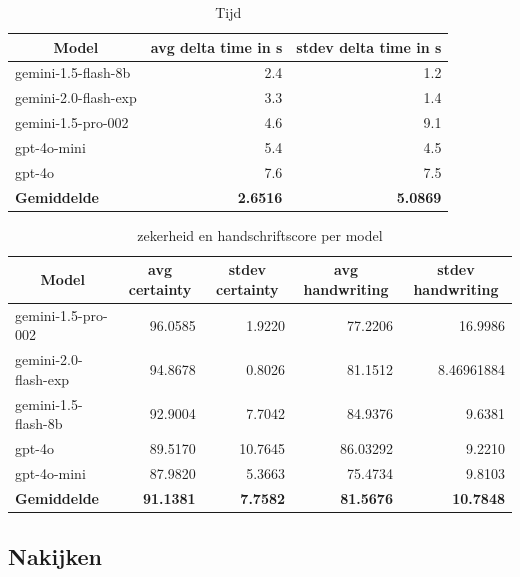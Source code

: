 \documentclass[12pt]{article}
\begin{document}
\noindent\begin{table}[H]
\caption{Tijd} 
\label{fig:time-model} 
\begin{tabularx}{\textwidth}{X *2{r}}
    \toprule
    \multicolumn{1}{c}{\textbf{Model}} & \multicolumn{1}{c}{\textbf{avg delta time in s}} & \multicolumn{1}{c}{\textbf{stdev delta time in s}} \\
    \midrule
    gemini-1.5-flash-8b & 2.4 & 1.2 \\
    gemini-2.0-flash-exp & 3.3 & 1.4 \\
    gemini-1.5-pro-002 & 4.6 & 9.1 \\
    gpt-4o-mini & 5.4 & 4.5 \\
    gpt-4o & 7.6 & 7.5 \\
    \midrule
    \textbf{Gemiddelde} & \textbf{2.6516} & \textbf{5.0869} \\
    \bottomrule
\end{tabularx}%
\end{table}

\noindent\begin{table}[H]
\caption{zekerheid en handschriftscore per model}
\label{fig:certainty-model}
\begin{tabularx}{\textwidth}{X *4{r}}
    \toprule
    \multicolumn{1}{c}{\textbf{Model}} & \multicolumn{1}{c}{\textbf{avg  certainty}} & \multicolumn{1}{c}{\textbf{stdev certainty}} & \multicolumn{1}{c}{\textbf{avg handwriting}} & \multicolumn{1}{c}{\textbf{stdev handwriting}} \\
    \midrule
    gemini-1.5-pro-002 & 96.0585 & 1.9220 & 77.2206 & 16.9986 \\
    gemini-2.0-flash-exp & 94.8678 & 0.8026 & 81.1512 & 8.46961884 \\
    gemini-1.5-flash-8b & 92.9004 & 7.7042 & 84.9376 & 9.6381 \\
    gpt-4o & 89.5170 & 10.7645 & 86.03292 & 9.2210 \\
    gpt-4o-mini & 87.9820 & 5.3663 & 75.4734 & 9.8103 \\
    \midrule
    \textbf{Gemiddelde} & \textbf{91.1381} & \textbf{7.7582} & \textbf{81.5676} & \textbf{10.7848} \\
    \bottomrule
\end{tabularx}%
\end{table}

\pagebreak
\subsection{Nakijken}
\end{document}
